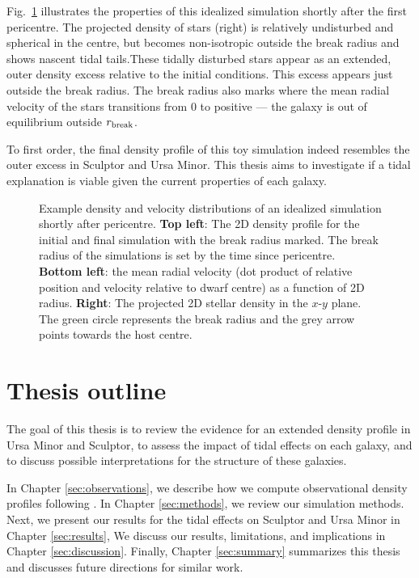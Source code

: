 Fig.~\ref{fig:idealized_break_radius} illustrates the properties of this
idealized simulation shortly after the first pericentre. The projected
density of stars (right) is relatively undisturbed and spherical in the
centre, but becomes non-isotropic outside the break radius and shows
nascent tidal tails.These tidally disturbed stars appear as an extended,
outer density excess relative to the initial conditions. This excess
appears just outside the break radius. The break radius also marks where
the mean radial velocity of the stars transitions from 0 to positive ---
the galaxy is out of equilibrium outside \(r_{\rm break}\).

To first order, the final density profile of this toy simulation indeed
resembles the outer excess in Sculptor and Ursa Minor. This thesis aims
to investigate if a tidal explanation is viable given the current
properties of each galaxy.

\begin{figure}
\centering
{}
\caption[Break radius validation]{Example density and velocity
distributions of an idealized simulation shortly after pericentre.
\textbf{Top left}: The 2D density profile for the initial and final
simulation with the break radius marked. The break radius of the
simulations is set by the time since pericentre. \textbf{Bottom left}:
the mean radial velocity (dot product of relative position and velocity
relative to dwarf centre) as a function of 2D radius. \textbf{Right}:
The projected 2D stellar density in the \(x\)-\(y\) plane. The green
circle represents the break radius and the grey arrow points towards the
host centre.}\label{fig:idealized_break_radius}
\end{figure}

\section{Thesis outline}\label{thesis-outline}

The goal of this thesis is to review the evidence for an extended
density profile in Ursa Minor and Sculptor, to assess the impact of
tidal effects on each galaxy, and to discuss possible interpretations
for the structure of these galaxies.

In Chapter \ref{sec:observations}, we describe how we compute
observational density profiles following \citet{jensen+2024}. In Chapter
\ref{sec:methods}, we review our simulation methods. Next, we present
our results for the tidal effects on Sculptor and Ursa Minor in Chapter
\ref{sec:results}, We discuss our results, limitations, and implications
in Chapter \ref{sec:discussion}. Finally, Chapter \ref{sec:summary}
summarizes this thesis and discusses future directions for similar work.

